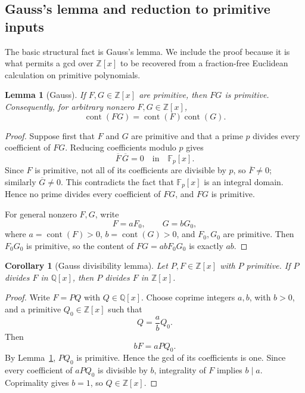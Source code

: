 \documentclass[11pt]{book}
\newtheorem{lemma}[theorem]{Lemma}
\newtheorem{corollary}[theorem]{Corollary}
\theoremstyle{definition}
\newcommand{\ZZ}{\mathbb Z}
\begin{document}
\subsection{Gauss's lemma and reduction to primitive inputs}

The basic structural fact is Gauss's lemma.  We include the proof because it is
what permits a gcd over $\ZZ[x]$ to be recovered from a fraction-free Euclidean
calculation on primitive polynomials.

\begin{lemma}[Gauss]\label{lem:gauss-primitive-product}
If $F,G\in\ZZ[x]$ are primitive, then $FG$ is primitive.
Consequently, for arbitrary nonzero $F,G\in\ZZ[x]$,
\begin{equation}\label{eq:content-multiplicative}
 \operatorname{cont}(FG)
 =\operatorname{cont}(F)\operatorname{cont}(G).
\end{equation}
\end{lemma}

\begin{proof}
Suppose first that $F$ and $G$ are primitive and that a prime $p$ divides every
coefficient of $FG$.  Reducing coefficients modulo $p$ gives
\[
 \overline F\,\overline G=0
 \quad\text{in}\quad \mathbb F_p[x].
\]
Since $F$ is primitive, not all of its coefficients are divisible by $p$, so
$\overline F\ne0$; similarly $\overline G\ne0$.  This contradicts the fact that
$\mathbb F_p[x]$ is an integral domain.  Hence no prime divides every
coefficient of $FG$, and $FG$ is primitive.

For general nonzero $F,G$, write
\[
 F=aF_0,\qquad G=bG_0,
\]
where $a=\operatorname{cont}(F)>0$, $b=\operatorname{cont}(G)>0$, and
$F_0,G_0$ are primitive.  Then $F_0G_0$ is primitive, so the content of
$FG=abF_0G_0$ is exactly $ab$.
\end{proof}

\begin{corollary}[Gauss divisibility lemma]\label{cor:gauss-divisibility}
Let $P,F\in\ZZ[x]$ with $P$ primitive.  If $P$ divides $F$ in $\mathbb Q[x]$,
then $P$ divides $F$ in $\ZZ[x]$.
\end{corollary}

\begin{proof}
Write $F=PQ$ with $Q\in\mathbb Q[x]$.  Choose coprime integers $a,b$, with
$b>0$, and a primitive $Q_0\in\ZZ[x]$ such that
\[
 Q=\frac ab Q_0.
\]
Then
\[
 bF=aPQ_0.
\]
By Lemma~\ref{lem:gauss-primitive-product}, $PQ_0$ is primitive.  Hence the gcd
of its coefficients is one.  Since every coefficient of $aPQ_0$ is divisible
by $b$, integrality of $F$ implies $b\mid a$.  Coprimality gives $b=1$, so
$Q\in\ZZ[x]$.
\end{proof}
\end{document}
